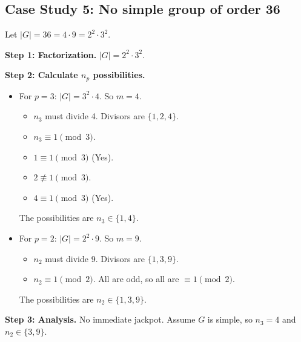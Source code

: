\documentclass[12pt,a4paper]{article}
\theoremstyle{plain} %
\theoremstyle{definition} %
\theoremstyle{remark} %
\begin{document}
\subsection{Case Study 5: No simple group of order 36}
Let $|G|=36 = 4 \cdot 9 = 2^2 \cdot 3^2$.

\textbf{Step 1: Factorization.} $|G|=2^2 \cdot 3^2$.

\textbf{Step 2: Calculate $n_p$ possibilities.}
\begin{itemize}
    \item For $p=3$: $|G|=3^2 \cdot 4$. So $m=4$.
        \begin{itemize}
            \item $n_3$ must divide 4. Divisors are $\{1, 2, 4\}$.
            \item $n_3 \equiv 1 \pmod{3}$.
                \item $1 \equiv 1 \pmod{3}$ (Yes).
                \item $2 \not\equiv 1 \pmod{3}$.
                \item $4 \equiv 1 \pmod{3}$ (Yes).
        \end{itemize}
        The possibilities are $n_3 \in \{1, 4\}$.

    \item For $p=2$: $|G|=2^2 \cdot 9$. So $m=9$.
        \begin{itemize}
            \item $n_2$ must divide 9. Divisors are $\{1, 3, 9\}$.
            \item $n_2 \equiv 1 \pmod{2}$. All are odd, so all are $\equiv 1 \pmod 2$.
        \end{itemize}
        The possibilities are $n_2 \in \{1, 3, 9\}$.
\end{itemize}

\textbf{Step 3: Analysis.}
No immediate jackpot. Assume $G$ is simple, so $n_3=4$ and $n_2 \in \{3,9\}$.
\end{document}

